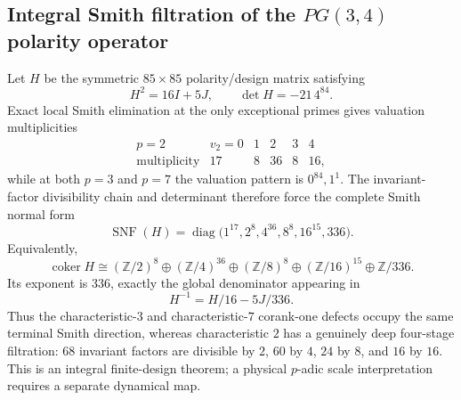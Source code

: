 \subsection{Integral Smith filtration of the $PG(3,4)$ polarity operator}
Let $H$ be the symmetric $85\times85$ polarity/design matrix satisfying
\[
H^2=16I+5J,\qquad \det H=-21\,4^{84}.
\]
Exact local Smith elimination at the only exceptional primes gives valuation multiplicities
\[
\begin{array}{c|ccccc}
p=2 & v_2=0&1&2&3&4\\\hline
\text{multiplicity}&17&8&36&8&16,
\end{array}
\]
while at both $p=3$ and $p=7$ the valuation pattern is $0^{84},1^1$.  The invariant-factor divisibility chain and determinant therefore force the complete Smith normal form
\[
\boxed{\operatorname{SNF}(H)=\operatorname{diag}\bigl(1^{17},2^8,4^{36},8^8,16^{15},336\bigr)}.
\]
Equivalently,
\[
\operatorname{coker}H\cong (\mathbb Z/2)^8\oplus(\mathbb Z/4)^{36}\oplus(\mathbb Z/8)^8\oplus(\mathbb Z/16)^{15}\oplus\mathbb Z/336.
\]
Its exponent is $336$, exactly the global denominator appearing in
\[
H^{-1}=H/16-5J/336.
\]
Thus the characteristic-$3$ and characteristic-$7$ corank-one defects occupy the same terminal Smith direction, whereas characteristic $2$ has a genuinely deep four-stage filtration: $68$ invariant factors are divisible by $2$, $60$ by $4$, $24$ by $8$, and $16$ by $16$.  This is an integral finite-design theorem; a physical $p$-adic scale interpretation requires a separate dynamical map.
